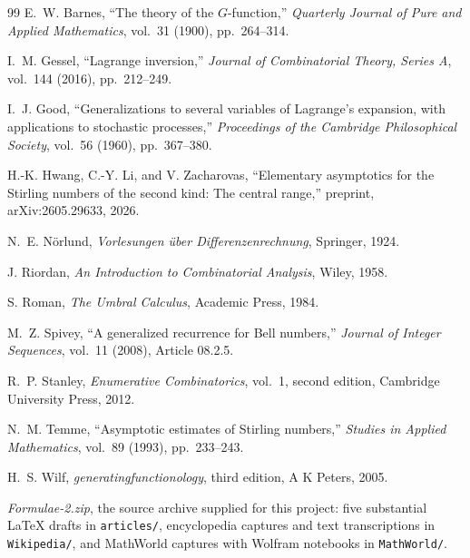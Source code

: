 \documentclass[11pt,a4paper,oneside,openany]{book}
\theoremstyle{definition}
\theoremstyle{remark}
\begin{document}
\begin{thebibliography}{99}
E.~W. Barnes,
``The theory of the $G$-function,''
\emph{Quarterly Journal of Pure and Applied Mathematics}, vol.~31 (1900),
pp.~264--314.

I.~M. Gessel,
``Lagrange inversion,''
\emph{Journal of Combinatorial Theory, Series A}, vol.~144 (2016),
pp.~212--249.

I.~J. Good,
``Generalizations to several variables of Lagrange's expansion, with applications
to stochastic processes,''
\emph{Proceedings of the Cambridge Philosophical Society}, vol.~56 (1960),
pp.~367--380.

H.-K. Hwang, C.-Y. Li, and V. Zacharovas,
``Elementary asymptotics for the Stirling numbers of the second kind:
The central range,''
preprint, arXiv:2605.29633, 2026.

N.~E. N\"orlund,
\emph{Vorlesungen \"uber Differenzenrechnung},
Springer, 1924.

J. Riordan,
\emph{An Introduction to Combinatorial Analysis},
Wiley, 1958.

S. Roman,
\emph{The Umbral Calculus},
Academic Press, 1984.

M.~Z. Spivey,
``A generalized recurrence for Bell numbers,''
\emph{Journal of Integer Sequences}, vol.~11 (2008), Article 08.2.5.

R.~P. Stanley,
\emph{Enumerative Combinatorics}, vol.~1, second edition,
Cambridge University Press, 2012.

N.~M. Temme,
``Asymptotic estimates of Stirling numbers,''
\emph{Studies in Applied Mathematics}, vol.~89 (1993), pp.~233--243.

H.~S. Wilf,
\emph{generatingfunctionology}, third edition,
A K Peters, 2005.

\emph{Formulae-2.zip}, the source archive supplied for this project: five
substantial LaTeX drafts in \nolinkurl{articles/}, encyclopedia captures and text
transcriptions in \nolinkurl{Wikipedia/}, and MathWorld captures with Wolfram
notebooks in \nolinkurl{MathWorld/}.

\end{thebibliography}

\printindex
\end{document}
